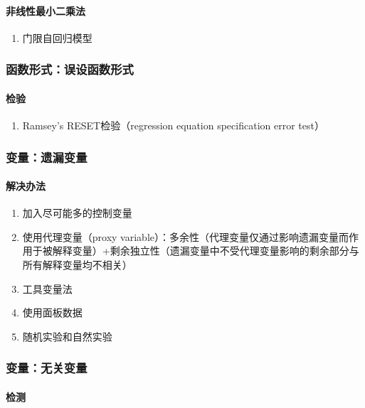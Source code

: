 \documentclass[12pt]{book}
\begin{document}
\paragraph{非线性最小二乘法}


\begin{enumerate}[1.]
    \item 门限自回归模型
\end{enumerate}


\subsubsection{函数形式：误设函数形式}

\paragraph{检验}

\begin{enumerate}[1.]
    \item Ramsey's RESET检验（regression equation specification error test）
\end{enumerate}

\subsubsection{变量：遗漏变量}

\paragraph{解决办法}

\begin{enumerate}[1.]
    \item 加入尽可能多的控制变量  
    \item 使用代理变量（proxy variable）：多余性（代理变量仅通过影响遗漏变量而作用于被解释变量）+剩余独立性（遗漏变量中不受代理变量影响的剩余部分与所有解释变量均不相关）  
    \item 工具变量法  
    \item 使用面板数据  
    \item 随机实验和自然实验 
\end{enumerate}


\subsubsection{变量：无关变量}



\paragraph{检测}
\end{document}
